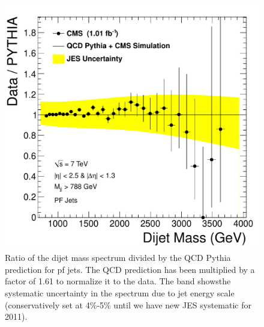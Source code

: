 \begin{figure}[!ht]
  \begin{center}
   \includegraphics[width=\textwidth]{Figures/data_over_pythia_pf.pdf}
    \caption{ Ratio of the dijet mass spectrum divided by the QCD Pythia prediction for pf jets. The
    QCD prediction has been multiplied by a factor of 1.61 to normalize it to the data.
    The band showsthe systematic uncertainty in the spectrum due to jet energy
    scale (conservatively set at 4\%-5\% until we have new JES systematic for 2011). }
    \label{DataOverPythia_pf}
  \end{center}
\end{figure}

